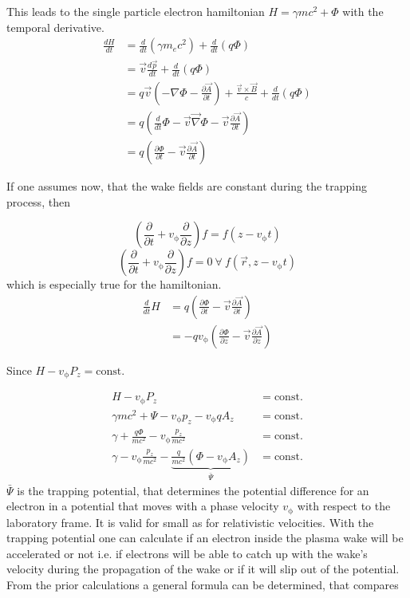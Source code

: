 This leads to the single particle electron hamiltonian $ H=\gamma m c^2+\Phi$ with the temporal derivative.
\begin{align}
\frac{dH}{dt}&=\frac{d}{dt} (\gamma m_e c^2)+\frac{d}{dt}(q\Phi)\\
&=\vec{v}\frac{d\vec{p}}{dt}+\frac{d}{dt}(q\Phi)\\
&=q\vec{v}(-\nabla \Phi-\frac{\partial \vec{A}}{\partial t})+\frac{\vec{v}\times\vec{B}}{c}+\frac{d}{dt}(q\Phi)\\
&=q(\frac{d}{dt}\Phi-\vec{v}\vec{\nabla}\Phi-\vec{v}\frac{\partial \vec{A}}{\partial t})\\
&=q(\frac{\partial \Phi}{\partial t}-\vec{v}\frac{\partial \vec{A}}{\partial t})
\end{align}

If one assumes now, that the wake fields are constant during the trapping process, then 

\begin{equation}
(\frac{\partial}{\partial t}+v_\mathrm{\phi} \frac{\partial}{\partial z} ) f =   f ( z-v_\mathrm{\phi} t)
\end{equation}\begin{equation}
(\frac{\partial}{\partial t}+v_\mathrm{\phi} \frac{\partial}{\partial z} ) f =0 \ \forall \   f (\vec{r}, z-v_\mathrm{\phi} t)
\end{equation}
which is especially true for the hamiltonian.
\begin{align*}
\frac{d}{dt}H&=q(\frac{\partial \Phi}{\partial t}-\vec{v}\frac{\partial \vec{A}}{\partial t})\\
&=-q v_\mathrm{\phi}(\frac{\partial \Phi}{\partial z}-\vec{v} \frac{\partial \vec{A}}{\partial z}) 
\end{align*}

Since $H-v_\mathrm{\phi}P_z=\mathrm{const.}$

\begin{align}
H-v_\mathrm{\phi}P_z &= \mathrm{const.}\\
\gamma m c^2+\Psi-v_\mathrm{\phi}p_z-v_\mathrm{\phi}qA_z &= \mathrm{const.}\\
\gamma+\frac{q \Phi}{m c^2}-v_\mathrm{\phi} \frac{p_z}{mc^2} &= \mathrm{const.}\\
\gamma - v_\mathrm{\phi} \frac{p_z}{mc^2}- \underbrace{\frac{q}{mc^2}(\Phi-v_\mathrm{\phi}A_z)}_{\bar{\Psi}}  &= \mathrm{const.} 
\end{align}
$\bar{\Psi}$ is the trapping potential, that determines the potential difference for an electron in a potential that moves with a phase velocity $v_\mathrm{\phi}$ with respect to the laboratory frame. It is valid for small as for relativistic velocities.
With the trapping potential one can calculate if an electron inside the plasma wake will be accelerated or not i.e. if electrons will be able to catch up with the wake's velocity during the propagation of the wake or if it will slip out of the potential.
From the prior calculations a general formula can be determined, that compares

